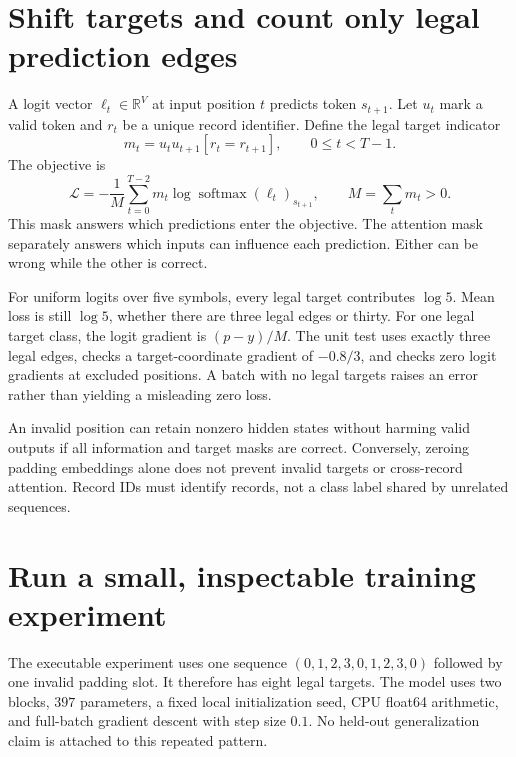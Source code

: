\section{Shift targets and count only legal prediction edges}
A logit vector $\ell_t\in\mathbb R^V$ at input position $t$ predicts token $s_{t+1}$. Let $u_t$ mark a valid token and $r_t$ be a unique record identifier. Define the legal target indicator
\begin{equation}
m_t=u_tu_{t+1}[r_t=r_{t+1}],\qquad 0\leq t<T-1.
\end{equation}
The objective is
\begin{equation}
\mathcal L=-\frac1M\sum_{t=0}^{T-2}m_t
\log\operatorname{softmax}(\ell_t)_{s_{t+1}},
\qquad M=\sum_t m_t>0. \label{eq:loss}
\end{equation}
This mask answers which predictions enter the objective. The attention mask separately answers which inputs can influence each prediction. Either can be wrong while the other is correct.


For uniform logits over five symbols, every legal target contributes $\log5$. Mean loss is still $\log5$, whether there are three legal edges or thirty. For one legal target class, the logit gradient is $(p-y)/M$. The unit test uses exactly three legal edges, checks a target-coordinate gradient of $-0.8/3$, and checks zero logit gradients at excluded positions. A batch with no legal targets raises an error rather than yielding a misleading zero loss.

An invalid position can retain nonzero hidden states without harming valid outputs if all information and target masks are correct. Conversely, zeroing padding embeddings alone does not prevent invalid targets or cross-record attention. Record IDs must identify records, not a class label shared by unrelated sequences.

\section{Run a small, inspectable training experiment}
The executable experiment uses one sequence $(0,1,2,3,0,1,2,3,0)$ followed by one invalid padding slot. It therefore has eight legal targets. The model uses two blocks, $397$ parameters, a fixed local initialization seed, CPU float64 arithmetic, and full-batch gradient descent with step size $0.1$. No held-out generalization claim is attached to this repeated pattern.

